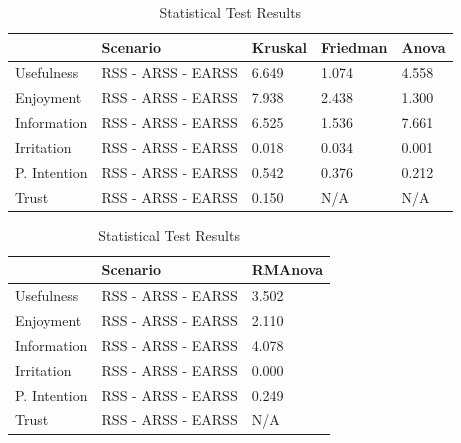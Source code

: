 \documentclass[letterpaper, 10 pt, conference]{ieeeconf}
\begin{document}
\begin{table}[h!]
\begin{tabular}{|l|l|l|l|l|}
\hline
             & Scenario           & Kruskal & Friedman & Anova \\ \hline
Usefulness   & RSS - ARSS - EARSS & 6.649   & 1.074    & 4.558 \\ \hline
Enjoyment    & RSS - ARSS - EARSS & 7.938   & 2.438    & 1.300 \\ \hline
Information  & RSS - ARSS - EARSS & 6.525   & 1.536    & 7.661 \\ \hline
Irritation   & RSS - ARSS - EARSS & 0.018   & 0.034    & 0.001 \\ \hline
P. Intention & RSS - ARSS - EARSS & 0.542   & 0.376    & 0.212 \\ \hline
Trust        & RSS - ARSS - EARSS & 0.150   & N/A      & N/A   \\ \hline
\end{tabular}
\caption{\label{table}Statistical Test Results}
\end{table}

\begin{table}[h!]
\begin{tabular}{|m{2.5cm}|m{3.0cm}|m{2.0cm}|}
\hline
             & Scenario           & RMAnova \\ \hline
Usefulness   & RSS - ARSS - EARSS & 3.502   \\ \hline
Enjoyment    & RSS - ARSS - EARSS & 2.110   \\ \hline
Information  & RSS - ARSS - EARSS & 4.078   \\ \hline
Irritation   & RSS - ARSS - EARSS & 0.000   \\ \hline
P. Intention & RSS - ARSS - EARSS & 0.249   \\ \hline
Trust        & RSS - ARSS - EARSS & N/A     \\ \hline
\end{tabular}
\caption{\label{table}Statistical Test Results}
\end{table}
\end{document}
